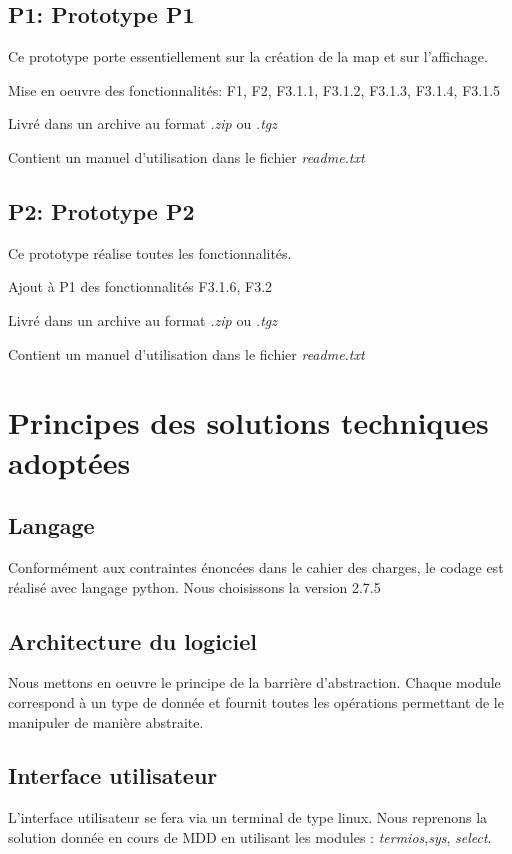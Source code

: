 \documentclass{article}
\begin{document}
        \subsection{P1: Prototype P1}
        Ce prototype porte essentiellement sur la création de la map et sur l'affichage.
        
        Mise en oeuvre des fonctionnalités: F1, F2, F3.1.1, F3.1.2, F3.1.3, F3.1.4, F3.1.5
        
        Livré dans un archive au format \emph{.zip} ou \emph{.tgz}
        
        Contient un manuel d'utilisation dans le fichier \emph{readme.txt}
        \subsection{P2: Prototype P2}
        Ce prototype réalise toutes les fonctionnalités.
        
        Ajout à P1 des fonctionnalités F3.1.6, F3.2
        
        Livré dans un archive au format \emph{.zip} ou \emph{.tgz}
        
        Contient un manuel d'utilisation dans le fichier \emph{readme.txt}
        \newpage
        
    \section{Principes des solutions techniques adoptées}
        \subsection{Langage}
        Conformément aux contraintes énoncées dans le cahier des charges, le codage est réalisé
avec langage python. Nous choisissons la version 2.7.5

        \subsection{Architecture du logiciel}
        Nous mettons en oeuvre le principe de la barrière d'abstraction. Chaque module correspond
à un type de donnée et fournit toutes les opérations permettant de le manipuler de manière
abstraite.

        \subsection{Interface utilisateur}
        L'interface utilisateur se fera via un terminal de type linux.
Nous reprenons la solution donnée en cours de MDD en utilisant les modules :
\emph{termios},\emph{sys}, \emph{select}.
\end{document}
